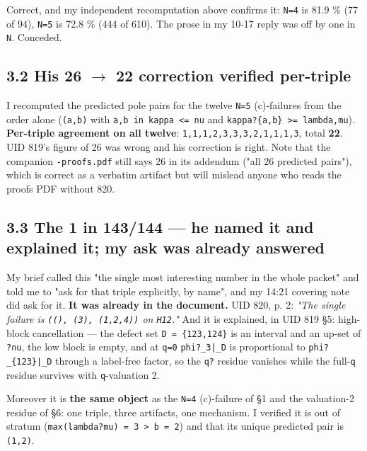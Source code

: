 \documentclass[11pt,a4paper]{article}
\begin{document}
Correct, and my independent recomputation above confirms it: \mbox{\texttt{N=4}} is 81.9 \% (77 of 94), \mbox{\texttt{N=5}} is 72.8 \% (444 of 610). The prose in my 10-17 reply was off by one in \mbox{\texttt{N}}. Conceded.

\subsection*{3.2 His 26 $\to$ 22 correction verified per-triple}

I recomputed the predicted pole pairs for the twelve \mbox{\texttt{N=5}} (c)-failures from the order alone (\mbox{\texttt{(a,b)}} with \mbox{\texttt{a,b in kappa <= nu}} and \mbox{\texttt{kappa?\{a,b\} >= lambda,mu}}). \textbf{Per-triple agreement on all twelve}: \mbox{\texttt{1,1,1,2,3,3,3,2,1,1,1,3}}, total \textbf{22}. UID 819's figure of 26 was wrong and his correction is right. Note that the companion \mbox{\texttt{-proofs.pdf}} still says 26 in its addendum ("all 26 predicted pairs"), which is correct as a verbatim artifact but will mislead anyone who reads the proofs PDF without 820.

\subsection*{3.3 The 1 in 143/144 --- he named it and explained it; my ask was already answered}

My brief called this "the single most interesting number in the whole packet" and told me to "ask for that triple explicitly, by name", and my 14:21 covering note did ask for it. \textbf{It was already in the document.} UID 820, p. 2: \emph{"The single failure is \mbox{\texttt{((), (3), (1,2,4))}} on \mbox{\texttt{H12}}."} And it is explained, in UID 819 \S{}5: high-block cancellation --- the defect set \mbox{\texttt{D = \{123,124\}}} is an interval and an up-set of \mbox{\texttt{?nu}}, the low block is empty, and at \mbox{\texttt{q=0}} \mbox{\texttt{phi?\_3|\_D}} is proportional to \mbox{\texttt{phi?\_\{123\}|\_D}} through a label-free factor, so the \mbox{\texttt{q?}} residue vanishes while the full-\mbox{\texttt{q}} residue survives with \mbox{\texttt{q}}-valuation 2.

Moreover it is \textbf{the same object} as the \mbox{\texttt{N=4}} (c)-failure of \S{}1 and the valuation-2 residue of \S{}6: one triple, three artifacts, one mechanism. I verified it is out of stratum (\mbox{\texttt{max(lambda?mu) = 3 > b = 2}}) and that its unique predicted pair is \mbox{\texttt{(1,2)}}.
\end{document}
